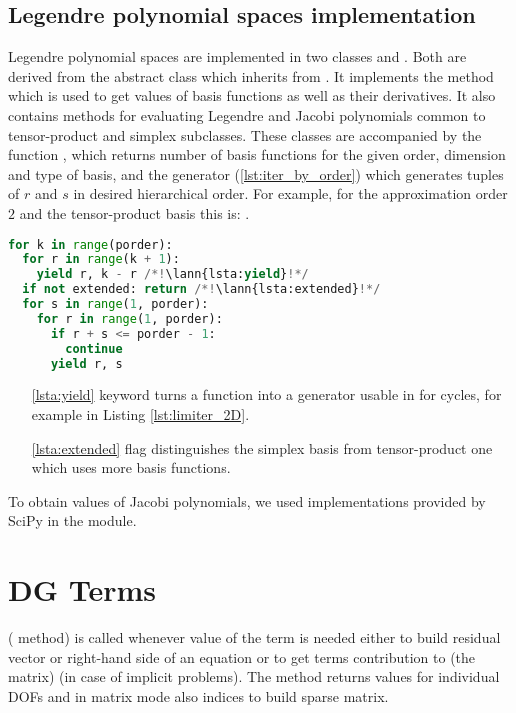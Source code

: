 \subsection{Legendre polynomial spaces implementation}
Legendre polynomial spaces are implemented in two classes
 and
. Both are derived from the abstract class
 which inherits from \sfepy{}
. It implements the method  which is used to get values of basis
functions as well as their derivatives. It also contains methods for evaluating Legendre and Jacobi
polynomials common to tensor-product and simplex subclasses. These classes are accompanied by the
function , which returns number of basis functions for the given order, dimension
and type of basis, and the generator  (\ref{lst:iter_by_order}) which generates
tuples of $r$ and $s$ in desired hierarchical order. For example, for the approximation order $2$ and the
tensor-product basis this is:
.
\setcounter{lstannotation}{0}
\begin{lstlisting}[language=Python, caption= Iteration over $r$ and $s$
indicies of basis functions \label{lst:iter_by_order}]
for k in range(porder):
  for r in range(k + 1):
    yield r, k - r /*!\lann{lsta:yield}!*/
  if not extended: return /*!\lann{lsta:extended}!*/
  for s in range(1, porder):
    for r in range(1, porder):
      if r + s <= porder - 1:
        continue
      yield r, s
\end{lstlisting}
\begin{itemize}
    \item[\ref{lsta:yield}]  keyword turns a function into a generator usable in for
    cycles, for example in Listing \ref{lst:limiter_2D}.
    \item[\ref{lsta:extended}]  flag distinguishes the simplex basis from
    tensor-product one which uses more basis functions.
\end{itemize}
To obtain values of Jacobi polynomials, we used implementations provided by SciPy in the
 module.


\section{DG Terms}
(\todo {} method) is called whenever value of the term is needed either
to build residual vector or right-hand side of an equation or to get terms contribution
to (\todo the matrix) (in case of implicit problems). The method returns values for
individual DOFs and in matrix mode also indices to build sparse matrix.

